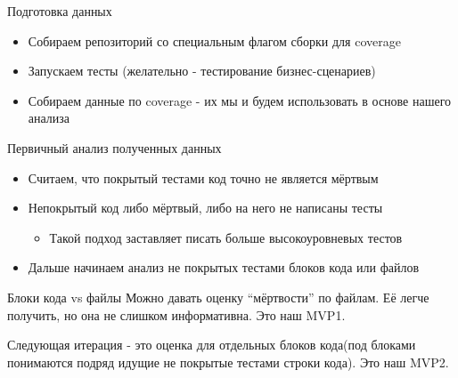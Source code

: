 \documentclass[aspectratio=169]{beamer}
\newcommand{\myskip}{\vspace{\baselineskip}}
\begin{document}
\begin{frame}{ Подготовка данных}
    \begin{itemize}
        \item Собираем репозиторий со специальным флагом сборки для coverage
        \item Запускаем тесты (желательно - тестирование бизнес-сценариев)
        \item Собираем данные по coverage - их мы и будем использовать в основе нашего анализа
    \end{itemize}
\end{frame}

\begin{frame}{Первичный анализ полученных данных}
    \begin{itemize}
        \item Считаем, что покрытый тестами код точно не является мёртвым
        \item Непокрытый код либо мёртвый, либо на него не написаны тесты
              \begin{itemize}
                  \item Такой подход заставляет писать больше высокоуровневых тестов
              \end{itemize}
        \item Дальше начинаем анализ не покрытых тестами блоков кода или файлов
    \end{itemize}
\end{frame}

\begin{frame}{Блоки кода vs файлы}
    Можно давать оценку ``мёртвости'' по файлам. Её легче получить, но она не слишком информативна. Это наш MVP1.

    \myskip
    Следующая итерация - это оценка для отдельных блоков кода(под блоками понимаются подряд идущие не покрытые тестами строки кода). Это наш MVP2.
\end{frame}
\end{document}
